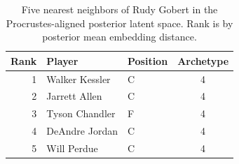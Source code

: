 \begin{table}[htbp]
  \centering\small
  \begin{tabular}{rllc}
    \toprule
    Rank & Player & Position & Archetype \\
    \midrule
    1 & Walker Kessler & C & 4 \\
    2 & Jarrett Allen & C & 4 \\
    3 & Tyson Chandler & F & 4 \\
    4 & DeAndre Jordan & C & 4 \\
    5 & Will Perdue & C & 4 \\
    \bottomrule
  \end{tabular}
  \caption{Five nearest neighbors of Rudy Gobert in the Procrustes-aligned posterior latent space. Rank is by posterior mean embedding distance.}
  \label{tab:Rudy_Gobert_neighbors}
\end{table}

